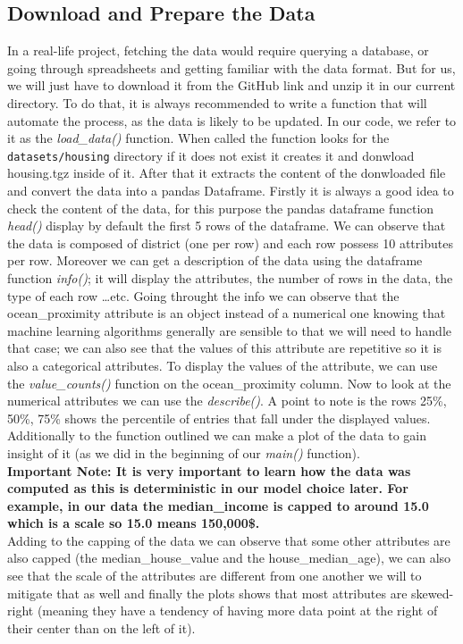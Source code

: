 \documentclass{article}
\begin{document}
\subsection{Download and Prepare the Data}
In a real-life project, fetching the data would require querying a database, or going through spreadsheets and getting familiar with the data 
format. But for us, we will just have to download it from the GitHub link and unzip it in our current directory. To do that, it is always 
recommended to write a function that will automate the process, as the data is likely to be updated. In our code, we refer to it as the 
\textit{load\_data()} function. When called the function looks for the \texttt{datasets/housing} directory if it does not exist it creates it and donwload
housing.tgz inside of it. After that it extracts the content of the donwloaded file and convert the data into a pandas Dataframe. Firstly it is
always a good idea to check the content of the data, for this purpose the pandas dataframe function \textit{head()} display by default the first
5 rows of the dataframe. We can observe that the data is composed of district (one per row) and each row possess 10 attributes per row. Moreover we can 
get a description of the data using the dataframe function \textit{info()}; it will display the attributes, the number of rows in the data, the type of
each row \ldots etc. Going throught the info we can observe that the ocean\_proximity attribute is an object instead of a numerical one knowing that
machine learning algorithms generally are sensible to that we will need to handle that case; we can also see that the values of this attribute are
repetitive so it is also a categorical attributes. To display the values of the attribute, we can use the \textit{value\_counts()} function on the
ocean\_proximity column. Now to look at the numerical attributes we can use the \textit{describe()}. A point to note is the rows 25\%, 50\%, 75\%
shows the percentile of entries that fall under the displayed values. Additionally to the function outlined we can make a plot of the data to
gain insight of it (as we did in the beginning of our \textit{main()} function). \\
\textbf{Important Note: It is very important to learn how the data was computed as this is deterministic in our model choice later. For example, in our data the median\_income is capped to around
15.0 which is a scale so 15.0 means 150,000\$.}\\
Adding to the capping of the data we can observe that some other attributes are also capped (the median\_house\_value and the house\_median\_age), we can
also see that the scale of the attributes are different from one another we will to mitigate that as well and finally the plots shows that most
attributes are skewed-right (meaning they have a tendency of having more data point at the right of their center than on the left of it).
\end{document}
